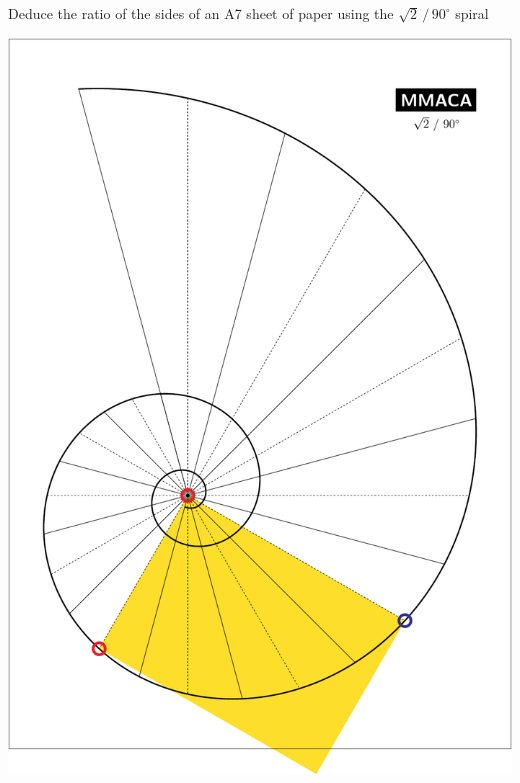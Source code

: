 \documentclass[a4paper,12pt]{article}
\begin{document}
    \begin{center}
    
        \large

        Deduce the ratio of the sides of an A7 sheet of paper using the $\sqrt{2} \, / \, 90^{\circ}$ spiral

        \bigskip \bigskip \bigskip
    
        \includegraphics[scale=0.7071]{./pictures/Example_02}

    \end{center}

    \newpage

\end{document}

